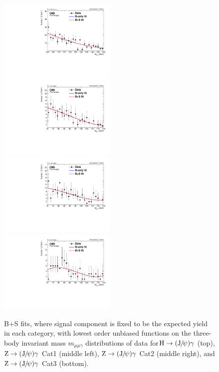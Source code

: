 		\begin{figure}[p]
		    \centering
		    \includegraphics[width=0.5\textwidth]{Fig/Fit/SBFit_fix/BkgSigFit_HJpsiG_Inclusive_Bernstein2}\\
		    \includegraphics[width=0.5\textwidth]{Fig/Fit/SBFit_fix/BkgSigFit_ZJpsiG_EBHR9_Bernstein3}~
		    \includegraphics[width=0.5\textwidth]{Fig/Fit/SBFit_fix/BkgSigFit_ZJpsiG_EBLR9_Bernstein3}\\
		    \includegraphics[width=0.5\textwidth]{Fig/Fit/SBFit_fix/BkgSigFit_ZJpsiG_EE_Bernstein3}\\
		    \caption[]{\label{fig:sbfitfix}
		     B+S fits, where signal component is fixed to be the expected yield in each category, with lowest order unbiased functions on the three-body invariant mass $m_{\mu\mu\gamma}$ distributions of data for$\mathrm{H}\to ({\mathrm{J}\hspace{-.08em}/\hspace{-.14em}\psi})\gamma$ (top), $\mathrm{Z}\to ({\mathrm{J}\hspace{-.08em}/\hspace{-.14em}\psi})\gamma$ Cat1 (middle left), $\mathrm{Z}\to ({\mathrm{J}\hspace{-.08em}/\hspace{-.14em}\psi})\gamma$ Cat2 (middle right), and $\mathrm{Z}\to ({\mathrm{J}\hspace{-.08em}/\hspace{-.14em}\psi})\gamma$ Cat3 (bottom).}
		\end{figure}
		
